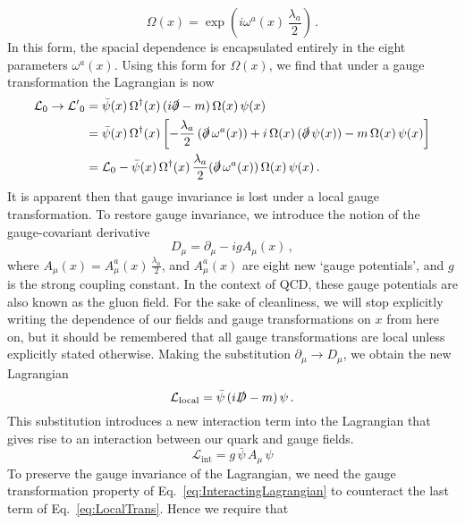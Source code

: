 %
\begin{equation}
\Omega(x)=\exp\left(i\omega^a(x)\,\frac{\lambda_a}{2}\right)\, .
\label{eq:LocalGaugeTransformation}
\end{equation}
%
In this form, the spacial dependence is encapsulated entirely in the eight parameters $\omega^a(x)$.  Using this form for $\Omega(x)$, we find that under a gauge transformation the Lagrangian is now
%
\begin{align}
\mathcal{L}_0\rightarrow\mathcal{L'}_0&=\bar{\psi}(x)\,\Omega^\dag(x)\,(i\slashed{\partial}-m)\,\Omega(x)\,\psi(x)\nonumber\\
&=\bar{\psi}(x)\,\Omega^\dag(x)\left[-\frac{\lambda_a}{2}\,(\slashed{\partial}\,\omega^a(x))+i\,\Omega(x)\,(\slashed{\partial}\,\psi(x))-m\,\Omega(x)\,\psi(x)\right]\nonumber\\
&= \mathcal{L}_0-\bar{\psi}(x)\,\Omega^\dag(x)\,\frac{\lambda_a}{2}(\slashed{\partial}\,\omega^a(x))\,\Omega(x)\,\psi(x)\, .\\
\label{eq:LocalTrans}
\end{align}
%
It is apparent then that gauge invariance is lost under a local gauge transformation. To restore gauge invariance, we introduce the notion of the gauge-covariant derivative
%
\begin{equation}
D_\mu = \partial_\mu - ig A_\mu(x)\, ,
\label{eq:CovariantDerivative}
\end{equation}
%
where $A_\mu(x)=A_\mu^a(x)\,\frac{\lambda_a}{2}$, and $A_\mu^a(x)$ are eight new `gauge potentials', and $g$ is the strong coupling constant. In the context of QCD, these gauge potentials are also known as the gluon field. For the sake of cleanliness, we will stop explicitly writing the dependence of our fields and gauge transformations on $x$ from here on, but it should be remembered that all gauge transformations are local unless explicitly stated otherwise. Making the substitution $\partial_\mu\rightarrow D_\mu$, we obtain the new Lagrangian
%
\begin{equation}
\mathcal{L}_\text{local} = \bar{\psi}\,(i\slashed{D}-m)\,\psi\,.
\end{equation}
%
This substitution introduces a new interaction term into the Lagrangian that gives rise to an interaction between our quark and gauge fields.
%
\begin{equation}
\mathcal{L}_\text{int} = g\,\bar{\psi}\,A_\mu\,\psi
\label{eq:InteractingLagrangian}
\end{equation}
%
To preserve the gauge invariance of the Lagrangian, we need the gauge transformation property of Eq.~\ref{eq:InteractingLagrangian} to counteract the last term of Eq.~\ref{eq:LocalTrans}. Hence we require that
